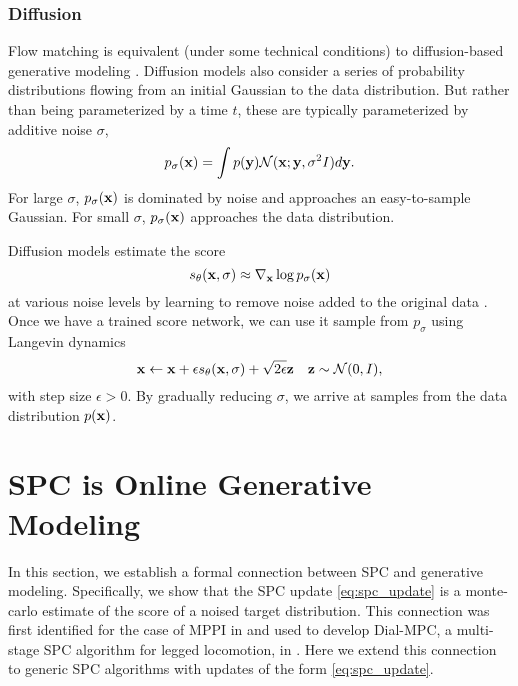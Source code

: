 \documentclass[letterpaper, 10 pt]{ieeeconf}
\begin{document}
\subsubsection{Diffusion}\label{sec:diffusion}

Flow matching is equivalent (under some technical conditions) to diffusion-based generative modeling \cite{gao2025diffusionmeetsflow}. Diffusion models also consider a series of probability distributions flowing from an initial Gaussian to the data distribution. But rather than being parameterized by a time $t$, these are typically parameterized by additive noise $\sigma$,
\begin{equation}
    p_\sigma(\mathbf{x}) = \int p(\mathbf{y}) \mathcal{N}(\mathbf{x};\mathbf{y}, \sigma^2I) d\mathbf{y}.
\end{equation}
For large $\sigma$, $p_\sigma(\mathbf{x})$ is dominated by noise and approaches an easy-to-sample Gaussian. For small $\sigma$, $p_\sigma(\mathbf{x})$ approaches the data distribution.

Diffusion models estimate the score
\begin{equation}
    s_\theta(\mathbf{x}, \sigma) \approx \nabla_{\mathbf{x}} \log p_\sigma(\mathbf{x})
\end{equation}
at various noise levels by learning to remove noise added to the original data \cite{song2019generative, song2020score}. Once we have a trained score network, we can use it sample from $p_\sigma$ using Langevin dynamics
\begin{equation}
    \mathbf{x} \gets \mathbf{x} + \epsilon s_\theta(\mathbf{x}, \sigma) + \sqrt{2\epsilon} \mathbf{z} \quad \mathbf{z} \sim\mathcal{N}(0, I),
\end{equation}
with step size $\epsilon > 0$. By gradually reducing $\sigma$, we arrive at samples from the data distribution $p(\mathbf{x})$.

\section{SPC is Online Generative Modeling}

In this section, we establish a formal connection between SPC and generative modeling. Specifically, we show that the SPC update \eqref{eq:spc_update} is a monte-carlo estimate of the score of a noised target distribution. This connection was first identified for the case of MPPI in \cite{pan2024model} and used to develop Dial-MPC, a multi-stage SPC algorithm for legged locomotion, in \cite{xue2024full}. Here we extend this connection to generic SPC algorithms with updates of the form \eqref{eq:spc_update}.
\end{document}
